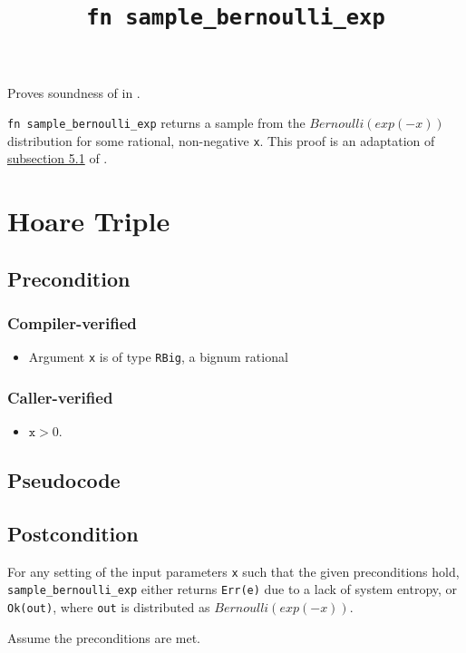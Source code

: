 \documentclass{article}
\title{\texttt{fn sample\_bernoulli\_exp}}
\author{\MichaelShoemateAuthor}
\begin{document}
\maketitle

Proves soundness of  in .

\texttt{fn sample\_bernoulli\_exp} returns a sample from the $Bernoulli(exp(-x))$ distribution for some rational, non-negative \texttt{x}.
This proof is an adaptation of \href{https://arxiv.org/pdf/2004.00010.pdf#subsection.5.1}{subsection 5.1} of \cite{CKS20}.

\section{Hoare Triple}
\subsection*{Precondition}
\subsubsection*{Compiler-verified}
\begin{itemize}
    \item Argument \texttt{x} is of type \texttt{RBig}, a bignum rational
\end{itemize}

\subsubsection*{Caller-verified}
\begin{itemize}
    \item $\texttt{x} > 0$.
\end{itemize}

\subsection*{Pseudocode}


\subsection*{Postcondition}
\begin{theorem}
\label{postcondition}
For any setting of the input parameters \texttt{x} such that the given preconditions hold, \\
\texttt{sample\_bernoulli\_exp} either returns \texttt{Err(e)} due to a lack of system entropy,
or \texttt{Ok(out)}, where \texttt{out} is distributed as $Bernoulli(exp(-x))$.
\end{theorem}
Assume the preconditions are met.
\end{document}
